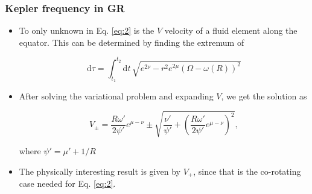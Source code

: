 \begin{frame}
\frametitle{Kepler frequency in GR}

\begin{itemize}
	\item To only unknown in Eq. \eqref{eq:2} is the $V$ velocity of a fluid element along the equator. This can be determined by finding the extremum of
	\begin{block}{}
		\begin{equation} \label{eq:3}
			\mathrm{d}\tau
			=
			\int_{t_{1}}^{t_{2}} \mathrm{d}t\,
			\sqrt{
				e^{2 \nu} - r^{2} e^{2 \mu} \left( \Omega - \omega \left( R \right) \right)^{2}
			}
		\end{equation}
	\end{block}
	\item After solving the variational problem and expanding $V$, we get the solution as
	\begin{block}{}
		\begin{equation} \label{eq:4}
			V_{\pm}
			=
			\frac{R \omega'}{2 \psi'} e^{\mu - \nu}
			\pm
			\sqrt{
				\frac{\nu'}{\psi'}
				+
				\left(
					\frac{R \omega'}{2 \psi'} e^{\mu - \nu}
				\right)^{2}
			},
		\end{equation}
	\end{block}
	where $\psi' = \mu' + 1 / R$
	\item The physically interesting result is given by $V_{+}$, since that is the co-rotating case needed for Eq. \eqref{eq:2}.
\end{itemize}

\end{frame}